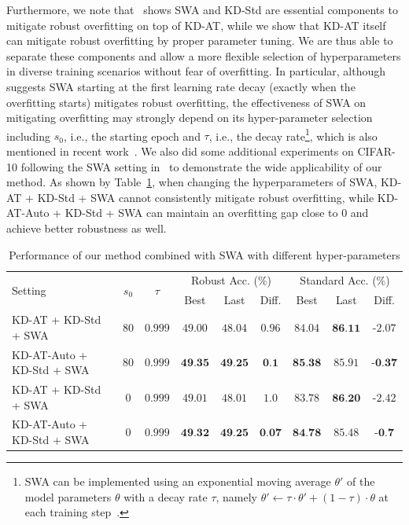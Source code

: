 Furthermore, we note that~\citep{chen2021robust} shows SWA and KD-Std are essential components to mitigate robust overfitting on top of KD-AT, while we show that KD-AT itself can mitigate robust overfitting by proper parameter tuning. We are thus able to separate these components and allow a more flexible selection of hyperparameters in diverse training scenarios without fear of overfitting. In particular, although~\citep{chen2021robust} suggests SWA starting at the first learning rate decay (exactly when the overfitting starts) mitigates robust overfitting, the effectiveness of SWA on mitigating overfitting may strongly depend on its hyper-parameter selection including $s_0$, i.e., the starting epoch and $\tau$, i.e., the decay rate\footnote{SWA can be implemented using an exponential moving average $\theta'$ of the model parameters $\theta$ with a decay rate $\tau$, namely $\theta' \leftarrow \tau \cdot \theta' + (1-\tau) \cdot \theta$ at each training step~\citep{Rebuffi2021FixingDA}.}, which is also mentioned in recent work~\citep{Rebuffi2021FixingDA}. We also did some additional experiments on CIFAR-10 following the SWA setting in~\citep{Rebuffi2021FixingDA} to demonstrate the wide applicability of our method. As shown by Table~\ref{table:result-swa}, when changing the hyperparameters of SWA, KD-AT + KD-Std + SWA cannot consistently mitigate robust overfitting, while KD-AT-Auto + KD-Std + SWA can maintain an overfitting gap close to 0 and achieve better robustness as well. 


\begin{table}[!ht]
  \small
  \caption{Performance of our method combined with SWA with different hyper-parameters}
  \vspace{0.5ex}
  \label{table:result-swa}
  \centering
  \small
  \begin{tabular}{lcccccccc}
    \toprule
    \multirow{2}{*}{Setting} & \multirow{2}{*}{$s_0$} & \multirow{2}{*}{$\tau$} & \multicolumn{3}{c}{Robust Acc. (\%)} & \multicolumn{3}{c}{Standard Acc. (\%)}\\
    & &  & Best & Last & Diff. & Best & Last & Diff.\\
    \midrule
    KD-AT + KD-Std + SWA & $80$ & $0.999$ & $49.00$ & $48.04$ & $0.96$ & $84.04$ & $\textbf{86.11}$ & -$2.07$\\
    KD-AT-Auto + KD-Std + SWA & $80$ & $0.999$ & $\textbf{49.35}$ & $\textbf{49.25}$ & $\textbf{0.1}$ & $\textbf{85.38}$ & $85.91$ & $\textbf{-0.37}$\\
    \midrule
    KD-AT + KD-Std + SWA & $0$ & $0.999$ & $49.01$ & $48.01$ & $1.0$ & $83.78$ & $\textbf{86.20}$ & -$2.42$\\
    KD-AT-Auto + KD-Std + SWA & $0$ & $0.999$ & $\textbf{49.32}$ & $\textbf{49.25}$ & $\textbf{0.07}$ & $\textbf{84.78}$ & $85.48$ & $\textbf{-0.7}$\\ 
    \bottomrule
  \end{tabular}
\end{table}
